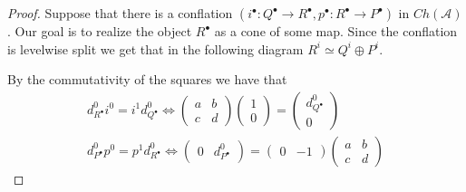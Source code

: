 \documentclass[11pt]{article}
\theoremstyle{definition}
\theoremstyle{remark}
\newcommand{\chain}[1]{#1^{\bullet}}
\begin{document}
            \begin{proof}
                Suppose that there is a conflation $(\chain{i}:\chain{Q}\rightarrow\chain{R},\chain{p}:\chain{R}\rightarrow\chain{P})$ in $Ch(\mathcal{A})$. Our goal is to realize the object $\chain{R}$ as a cone of some map. Since the conflation is levelwise split we get that in the following diagram $R^i\simeq Q^i\oplus P^i$.
                \begin{center}
                \end{center}

                By the commutativity of the squares we have that
                \begin{align*}
                    d^0_{\chain{R}}i^0=i^1d^0_{\chain{Q}} \iff \begin{pmatrix} a & b \\ c & d \end{pmatrix}\begin{pmatrix} 1 \\ 0 \end{pmatrix} = \begin{pmatrix} d^0_{\chain{Q}} \\ 0 \end{pmatrix} \\
                    d^0_{\chain{P}}p^0=p^1d^0_{\chain{R}} \iff \begin{pmatrix} 0 & d^0_{\chain{P}} \end{pmatrix} = \begin{pmatrix} 0 & -1 \end{pmatrix}\begin{pmatrix} a & b \\ c & d \end{pmatrix}
                \end{align*}


\end{proof}
\end{document}
